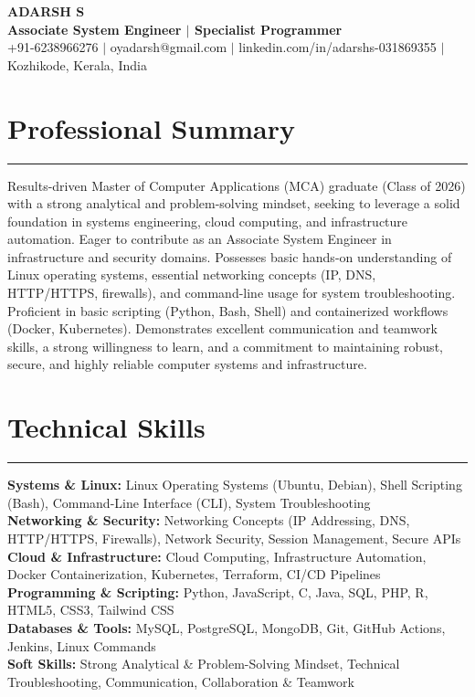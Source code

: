 \documentclass[letterpaper,10pt]{article}
\begin{document}
\begin{center}
\textbf{\LARGE ADARSH S} \\
\vspace{4pt}
\textbf{Associate System Engineer $|$ Specialist Programmer} \\
\vspace{4pt}
+91-6238966276 $|$ oyadarsh@gmail.com $|$ linkedin.com/in/adarshs-031869355 $|$ Kozhikode, Kerala, India
\end{center}

\vspace{6pt}

\section*{Professional Summary}
\hrule
\vspace{4pt}

Results-driven Master of Computer Applications (MCA) graduate (Class of 2026) with a strong analytical and problem-solving mindset, seeking to leverage a solid foundation in systems engineering, cloud computing, and infrastructure automation. Eager to contribute as an Associate System Engineer in infrastructure and security domains. Possesses basic hands-on understanding of Linux operating systems, essential networking concepts (IP, DNS, HTTP/HTTPS, firewalls), and command-line usage for system troubleshooting. Proficient in basic scripting (Python, Bash, Shell) and containerized workflows (Docker, Kubernetes). Demonstrates excellent communication and teamwork skills, a strong willingness to learn, and a commitment to maintaining robust, secure, and highly reliable computer systems and infrastructure.

\section*{Technical Skills}
\hrule
\vspace{4pt}

\textbf{Systems \& Linux:} Linux Operating Systems (Ubuntu, Debian), Shell Scripting (Bash), Command-Line Interface (CLI), System Troubleshooting \\
\textbf{Networking \& Security:} Networking Concepts (IP Addressing, DNS, HTTP/HTTPS, Firewalls), Network Security, Session Management, Secure APIs \\
\textbf{Cloud \& Infrastructure:} Cloud Computing, Infrastructure Automation, Docker Containerization, Kubernetes, Terraform, CI/CD Pipelines \\
\textbf{Programming \& Scripting:} Python, JavaScript, C, Java, SQL, PHP, R, HTML5, CSS3, Tailwind CSS \\
\textbf{Databases \& Tools:} MySQL, PostgreSQL, MongoDB, Git, GitHub Actions, Jenkins, Linux Commands \\
\textbf{Soft Skills:} Strong Analytical & Problem-Solving Mindset, Technical Troubleshooting, Communication, Collaboration & Teamwork
\end{document}
